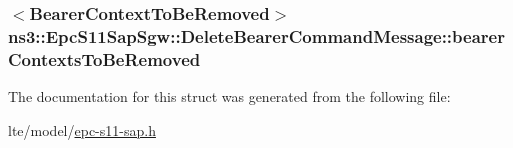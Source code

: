 \subsubsection[{\texorpdfstring{bearer\+Contexts\+To\+Be\+Removed}{bearerContextsToBeRemoved}}]{$<${\bf Bearer\+Context\+To\+Be\+Removed}$>$ ns3\+::\+Epc\+S11\+Sap\+Sgw\+::\+Delete\+Bearer\+Command\+Message\+::bearer\+Contexts\+To\+Be\+Removed}\hypertarget{structns3_1_1EpcS11SapSgw_1_1DeleteBearerCommandMessage_a8b4172d2e75df07ce0d9680cb38e84a5}{}\label{structns3_1_1EpcS11SapSgw_1_1DeleteBearerCommandMessage_a8b4172d2e75df07ce0d9680cb38e84a5}


The documentation for this struct was generated from the following file\+:\begin{DoxyCompactItemize}
\item 
lte/model/\hyperlink{epc-s11-sap_8h}{epc-\/s11-\/sap.\+h}\end{DoxyCompactItemize}
